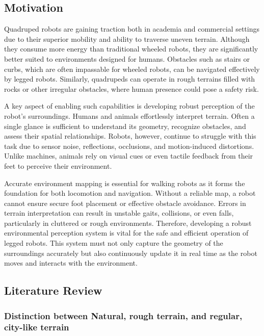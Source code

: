 \subsection{Motivation}
Quadruped robots are gaining traction both in academia \cite{mitcheetah3} \cite{anybotics2025}
and commercial settings \cite{unitree2024} \cite{bostondynamics2025} due to their superior mobility and ability to traverse uneven terrain. Although they consume more energy than traditional wheeled robots, they are significantly better suited to environments designed for humans. Obstacles such as stairs or curbs, which are often impassable for wheeled robots, can be navigated effectively by legged robots. Similarly, quadrupeds can operate in rough terrains filled with rocks or other irregular obstacles, where human presence could pose a safety risk.

A key aspect of enabling such capabilities is developing robust perception of the robot’s surroundings. Humans and animals effortlessly interpret terrain. Often a single glance is sufficient to understand its geometry, recognize obstacles, and assess their spatial relationships. Robots, however, continue to struggle with this task due to sensor noise, reflections, occlusions, and motion-induced distortions. Unlike machines, animals rely on visual cues or even tactile feedback from their feet to perceive their environment.

Accurate environment mapping is essential for walking robots as it forms the foundation for both locomotion and navigation. Without a reliable map, a robot cannot ensure secure foot placement or effective obstacle avoidance. Errors in terrain interpretation can result in unstable gaits, collisions, or even falls, particularly in cluttered or rough environments. Therefore, developing a robust environmental perception system is vital for the safe and efficient operation of legged robots. This system must not only capture the geometry of the surroundings accurately but also continuously update it in real time as the robot moves and interacts with the environment.


\subsection{Literature Review}

\subsubsection{Distinction between Natural, rough terrain, and regular, city-like terrain}

